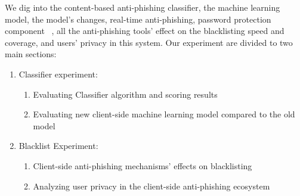 \documentclass[letterpaper,twocolumn,10pt]{article}
\begin{document}




We dig into the content-based anti-phishing classifier, the machine learning model, the model's changes, real-time anti-phishing, password protection component ~\cite{google-online-security-blog-2019}, all the anti-phishing tools' effect on the blacklisting speed and coverage, and users' privacy in this system.
Our experiment are divided to two main sections:
\begin{enumerate}
    \item Classifier experiment: 
    \begin{enumerate}
        \item Evaluating Classifier algorithm and scoring results
        \item Evaluating new client-side machine learning model compared to the old model
    \end{enumerate}
    \item Blacklist Experiment:
    \begin{enumerate}
        \item Client-side anti-phishing mechanisms' effects on blacklisting
        \item Analyzing user privacy in the client-side anti-phishing ecosystem
    \end{enumerate}
\end{enumerate}
\end{document}
